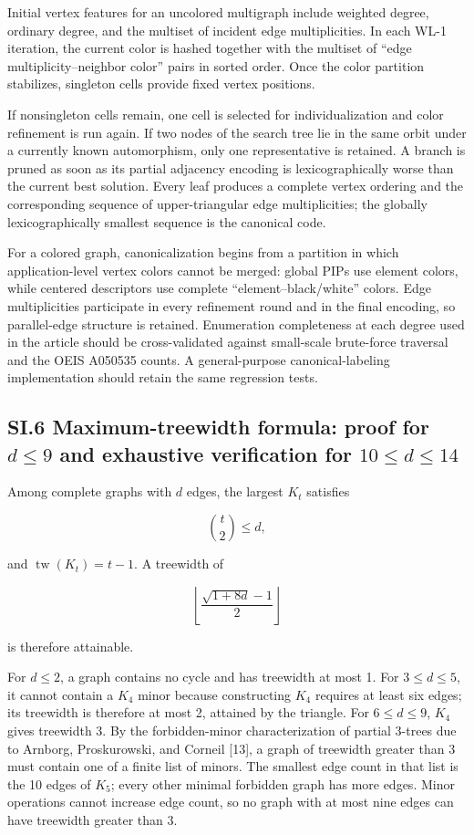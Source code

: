 Initial vertex features for an uncolored multigraph include weighted degree, ordinary degree, and the multiset of incident edge multiplicities. In each WL-1 iteration, the current color is hashed together with the multiset of ``edge multiplicity--neighbor color'' pairs in sorted order. Once the color partition stabilizes, singleton cells provide fixed vertex positions.

If nonsingleton cells remain, one cell is selected for individualization and color refinement is run again. If two nodes of the search tree lie in the same orbit under a currently known automorphism, only one representative is retained. A branch is pruned as soon as its partial adjacency encoding is lexicographically worse than the current best solution. Every leaf produces a complete vertex ordering and the corresponding sequence of upper-triangular edge multiplicities; the globally lexicographically smallest sequence is the canonical code.

For a colored graph, canonicalization begins from a partition in which application-level vertex colors cannot be merged: global PIPs use element colors, while centered descriptors use complete ``element--black/white'' colors. Edge multiplicities participate in every refinement round and in the final encoding, so parallel-edge structure is retained. Enumeration completeness at each degree used in the article should be cross-validated against small-scale brute-force traversal and the OEIS A050535 counts. A general-purpose canonical-labeling implementation should retain the same regression tests.

\subsection{\texorpdfstring{SI.6 Maximum-treewidth formula: proof for \(d\le9\) and exhaustive verification for \(10\le d\le14\)}{SI.6 Maximum-treewidth formula: proof for d <= 9 and exhaustive verification for 10 <= d <= 14}}\label{sec:si-treewidth}

Among complete graphs with \(d\) edges, the largest \(K_t\) satisfies

\[
\binom{t}{2}\le d,
\]

and \(\operatorname{tw}(K_t)=t-1\). A treewidth of

\[
\left\lfloor\frac{\sqrt{1+8d}-1}{2}\right\rfloor
\]

is therefore attainable.

For \(d\le2\), a graph contains no cycle and has treewidth at most 1. For \(3\le d\le5\), it cannot contain a \(K_4\) minor because constructing \(K_4\) requires at least six edges; its treewidth is therefore at most 2, attained by the triangle. For \(6\le d\le9\), \(K_4\) gives treewidth 3. By the forbidden-minor characterization of partial 3-trees due to Arnborg, Proskurowski, and Corneil {[}13{]}, a graph of treewidth greater than 3 must contain one of a finite list of minors. The smallest edge count in that list is the 10 edges of \(K_5\); every other minimal forbidden graph has more edges. Minor operations cannot increase edge count, so no graph with at most nine edges can have treewidth greater than 3.

